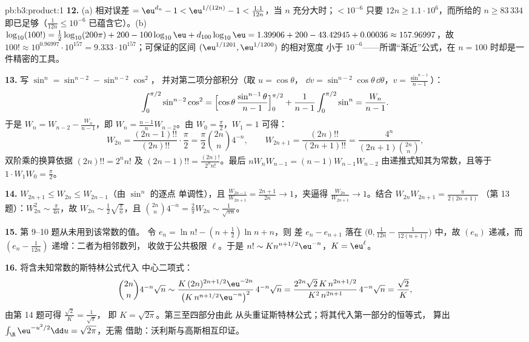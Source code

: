\begin{solution}{pb:b3:product:1}
\textbf{12.} (a) 相对误差 $= \eu^{d_n} - 1 <
\eu^{1/(12n)} - 1 < \frac{1.1}{12n}$，当 $n$ 充分大时；$<
10^{-6}$ 只要 $12n \geq 1.1\cdot10^6$，而所给的
$n \geq 83\,334$ 即已足够（$\frac1{12n} \leq 10^{-6}$
已蕴含它）。(b) $\log_{10}(100!) =
\frac12\log_{10}(200\pi) + 200 - 100\log_{10}\eu +
d_{100}\log_{10}\eu = 1.39906 + 200 - 43.42945 + 0.00036
\approx 157.96997$，故 $100! \approx 10^{0.96997} \cdot
10^{157} = 9.333\cdot10^{157}$；可保证的区间
$(\eu^{1/1201}, \eu^{1/1200})$ 的相对宽度
小于 $10^{-6}$——所谓“渐近”公式，在 $n =
100$ 时却是一件精密的工具。

\textbf{13.} 写 $\sin^n = \sin^{n-2} - \sin^{n-2}\cos^2$，
并对第二项分部积分（取 $u = \cos\theta$，
$\dd v = \sin^{n-2}\cos\theta\,\dd\theta$，$v =
\frac{\sin^{n-1}}{n-1}$）：
\[
\int_0^{\pi/2}\sin^{n-2}\cos^2 =
\Bigl[\cos\theta\,\frac{\sin^{n-1}\theta}{n-1}\Bigr]_0^{\pi/2}
+ \frac1{n-1}\int_0^{\pi/2}\sin^n = \frac{W_n}{n-1} .
\]
于是 $W_n = W_{n-2} - \frac{W_n}{n-1}$，即 $W_n =
\frac{n-1}nW_{n-2}$。由 $W_0 = \frac\pi2$，$W_1 = 1$ 可得：
\[
W_{2n} = \frac{(2n-1)!!}{(2n)!!}\cdot\frac\pi2
= \frac\pi2\binom{2n}n4^{-n},
\qquad
W_{2n+1} = \frac{(2n)!!}{(2n+1)!!}
= \frac{4^n}{(2n+1)\binom{2n}n},
\]
双阶乘的换算依据 $(2n)!! = 2^nn!$ 及
$(2n-1)!! = \frac{(2n)!}{2^nn!}$。最后 $nW_nW_{n-1} =
(n-1)W_{n-1}W_{n-2}$ 由递推式知其为常数，且等于
$1\cdot W_1W_0 = \frac\pi2$。

\textbf{14.} $W_{2n+1} \leq W_{2n} \leq W_{2n-1}$（由 $\sin^n$ 的逐点
单调性），且 $\frac{W_{2n-1}}{W_{2n+1}} =
\frac{2n+1}{2n} \to 1$，夹逼得 $\frac{W_{2n}}{W_{2n+1}} \to
1$。结合 $W_{2n}W_{2n+1} = \frac{\pi}{2(2n+1)}$
（第 13 题）：$W_{2n}^2 \sim \frac\pi{4n}$，故 $W_{2n} \sim
\frac12\sqrt{\frac\pi n}$，且 $\binom{2n}n4^{-n} =
\frac2\pi W_{2n} \sim \frac1{\sqrt{\pi n}}$。

\textbf{15.} 第 9--10 题从未用到该常数的值。
令 $e_n = \ln n! - (n+\frac12)\ln n + n$，则
差 $e_n - e_{n+1}$ 落在 $\bigl(0, \frac1{12n} -
\frac1{12(n+1)}\bigr)$ 中，故 $(e_n)$ 递减，而 $(e_n -
\frac1{12n})$ 递增：二者为相邻数列，
收敛于公共极限 $\ell$。于是 $n! \sim K n^{n+1/2}\eu^{-n}$，$K =
\eu^\ell$。

\textbf{16.} 将含未知常数的斯特林公式代入
中心二项式：
\[
\binom{2n}n4^{-n}\sqrt n \sim
\frac{K\,(2n)^{2n+1/2}\eu^{-2n}}{\bigl(K\,n^{n+1/2}
\eu^{-n}\bigr)^2}\,4^{-n}\sqrt n
= \frac{2^{2n}\sqrt{2}\,K\,n^{2n+1/2}}{K^2\,n^{2n+1}}
\,4^{-n}\sqrt n = \frac{\sqrt2}{K},
\]
由第 14 题可得 $\frac{\sqrt2}K = \frac1{\sqrt\pi}$，
即 $K = \sqrt{2\pi}$。第三至四部分由此
从头重证斯特林公式；将其代入第一部分的恒等式，
算出 $\int_\R\eu^{-u^2/2}\dd u = \sqrt{2\pi}$，无需
借助：沃利斯与高斯相互印证。


\end{solution}
